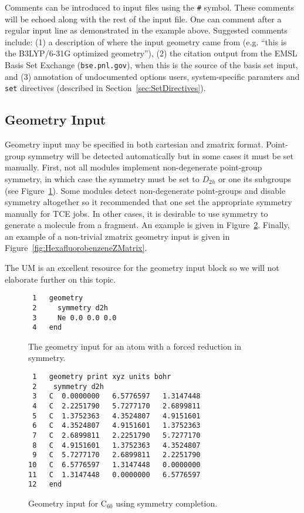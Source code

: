 \documentclass[letterpaper,12pt]{article}
\begin{document}
Comments can be introduced to input files using the \texttt{\#} symbol.  These comments will be echoed along with the rest of the input file.  One can comment after a regular input line as demonstrated in the example above.  Suggested comments include: (1) a description of where the input geometry came from (e.g. ``this is the B3LYP/6-31G optimized geometry''), (2) the citation output from the EMSL Basis Set Exchange (\texttt{bse.pnl.gov}), when this is the source of the basis set input, and (3) annotation of undocumented options users, system-specific paramters and \texttt{set} directives (described in Section~\ref{sec:SetDirectives}).

\newpage

\subsection{Geometry Input}\label{sec:GeometryInput}

Geometry input may be specified in both cartesian and zmatrix format.  Point-group symmetry will be detected automatically but in some cases it must be set manually.  First, not all modules implement non-degenerate point-group symmetry, in which case the symmetry must be set to $D_{2h}$ or one its subgroups (see Figure~\ref{fig:NeonGeometry}).  Some modules detect non-degenerate point-groups and disable symmetry altogether so it recommended that one set the appropriate symmetry manually for TCE jobs.  In other cases, it is desirable to use symmetry to generate a molecule from a fragment.  An example is given in Figure~\ref{fig:C60geometry}.  Finally, an example of a non-trivial zmatrix geometry input is given in Figure~\ref{fig:HexafluorobenzeneZMatrix}.

The UM is an excellent resource for the geometry input block so we will not elaborate further on this topic.

\begin{figure}
    \caption{The geometry input for an atom with a forced reduction in symmetry.}
    \label{fig:NeonGeometry}
    \begin{verbatim}
 1   geometry
 2     symmetry d2h
 3     Ne 0.0 0.0 0.0
 4   end
    \end{verbatim}
\end{figure}

\begin{figure}
    \caption{Geometry input for C$_{60}$ using symmetry completion.}
    \label{fig:C60geometry}
    \begin{verbatim}
 1   geometry print xyz units bohr
 2    symmetry d2h
 3   C  0.0000000   6.5776597   1.3147448
 4   C  2.2251790   5.7277170   2.6899811
 5   C  1.3752363   4.3524807   4.9151601
 6   C  4.3524807   4.9151601   1.3752363
 7   C  2.6899811   2.2251790   5.7277170
 8   C  4.9151601   1.3752363   4.3524807
 9   C  5.7277170   2.6899811   2.2251790
10   C  6.5776597   1.3147448   0.0000000
11   C  1.3147448   0.0000000   6.5776597
12   end
    \end{verbatim}
\end{figure}
\end{document}
